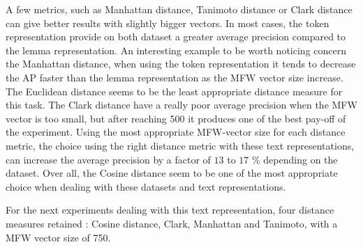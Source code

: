 A few metrics, such as Manhattan distance, Tanimoto distance or Clark distance can give better results with slightly bigger vectors.
In most cases, the token representation provide on both dataset a greater average precision compared to the lemma representation.
An interesting example to be worth noticing concern the Manhattan distance, when using the token representation it tends to decrease the AP faster than the lemma representation as the MFW vector size increase.
The Euclidean distance seems to be the least appropriate distance measure for this task.
The Clark distance have a really poor average precision when the MFW vector is too small, but after reaching 500 it produces one of the best pay-off of the experiment.
Using the most appropriate MFW-vector size for each distance metric, the choice using the right distance metric with these text representations, can increase the average precision by a factor of $13$ to $17$ \% depending on the dataset.
Over all, the Cosine distance seem to be one of the most appropriate choice when dealing with these datasets and text representations.

For the next experiments dealing with this text representation, four distance measures retained : Cosine distance, Clark, Manhattan and Tanimoto, with a MFW vector size of 750.

